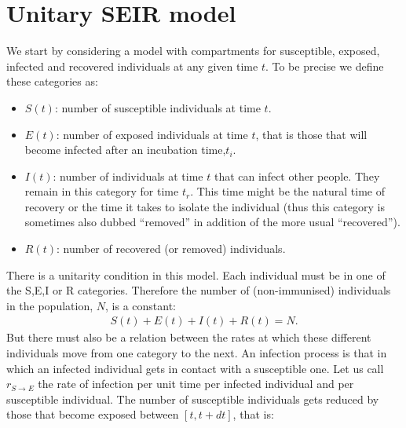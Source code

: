 \documentclass[a4paper,oneside,11pt]{article}
\begin{document}
\section{Unitary SEIR model}
We start by considering a model with compartments for susceptible, exposed, infected and recovered individuals at any given time $t$. To be precise we define these categories
as:
\begin{itemize}
\item $S(t)$: number of susceptible individuals at time $t$.
\item $E(t)$: number of exposed individuals at time $t$, that is those that will become infected after an incubation time,$t_i$. 
\item $I(t)$: number of individuals at time $t$ that can infect other people. They remain in this category for time $t_r$. This time might be the natural time of recovery or the time it takes to isolate the individual (thus this category is sometimes also dubbed ``removed'' in addition of the more usual ``recovered''). 
\item $R(t)$: number of recovered (or removed) individuals.
\end{itemize}
There is a unitarity condition in this model.  Each individual must be in one of the S,E,I or R categories. Therefore the number of (non-immunised) individuals in the population, $N$, is a constant:
\begin{eqnarray}
S(t)+ E(t)+I(t)+R(t) = N.
\end{eqnarray}
But there must also be a relation between the rates at which these different individuals move from one category to the next. An infection process is that in which an infected individual gets in contact with a susceptible one. Let us call $r_{S\rightarrow E}$ the rate of infection per unit time
per infected individual and per susceptible individual. The number of susceptible individuals gets reduced by those that become exposed between $[t, t+dt]$, that is:
\end{document}
